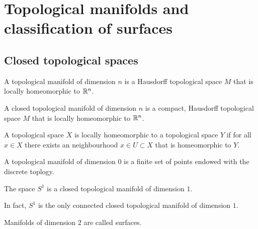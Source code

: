 \documentclass[11pt,a4paper]{article}
\begin{document}
\section{Topological manifolds and classification of surfaces}

\subsection{Closed topological spaces}
\begin{definition}
  A topological manifold of dimension $n$ is a Hausdorff
  topological space $M$ that is locally homeomorphic to $\mathbb{R}^n$.
\end{definition}

\begin{definition}
  A closed topological manifold of dimension $n$ is a compact, Hausdorff
  topological space $M$ that is locally homeomorphic to $\mathbb{R}^n$.
\end{definition}
\begin{remark}
  A topological space $X$ is locally homeomorphic to a topological space
  $Y$ if for all $x \in X$ there exists an neighbourhood $x \in U \subset X$
  that is homeomorphic to $Y$.
\end{remark}

\begin{example}
  A topological manifold of dimension $0$ is a finite set of points endowed
  with the discrete toplogy.
\end{example}

\begin{example}
  The space $S^1$ is a closed topological manifold of dimension $1$.
\end{example}
\begin{remark}
  In fact, $S^1$ is the only connected closed topological manifold
  of dimension $1$.
\end{remark}

\begin{remark}
  Manifolds of dimension $2$ are called surfaces.
\end{remark}
\end{document}
